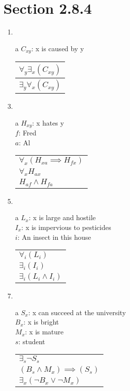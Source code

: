 \documentclass{article}
\begin{document}
	\section{Section 2.8.4}
	\begin{enumerate}
		\item
		\item[a]
			$C_{xy}$: x is caused by y\\
			\begin{tabular}{l}
				$\forall _y \exists _x (C_{xy})$\\ \hline
				$\exists _y \forall _x (C_{xy})$\\
			\end{tabular}
		\item
		\item[a]
			$H_{xy}$: x hates y\\
			$f$: Fred\\
			$a$: Al\\
			\begin{tabular}{l}
				$\forall _x (H_{xa} \implies H_{fx})$\\
				$\forall _x H_{ax}$\\ \hline
				$H_{af} \land H_{fa}$\\
			\end{tabular}
		\item
		\item[a]
			$L_x$: x is large and hostile\\
			$I_x$: x is impervious to pesticides\\
			$i$: An insect in this house\\
			\begin{tabular}{l}
				$\forall _i (L_i)$\\
				$\exists _i (I_i)$\\\hline
				$\exists _i (L_i \land I_i)$\\
			\end{tabular}
		\item
		\item[a]
			$S_x$: x can succeed at the university\\
			$B_x$: x is bright\\
			$M_x$: x is mature\\
			$s$: student\\
			\begin{tabular}{l}
				$\exists _s \lnot S_s$\\
				$(B_s \land M_x) \implies (S_s)$\\ \hline
				$\exists _x (\lnot B_x \lor \lnot M_x)$\\

\end{tabular}
\end{enumerate}
\end{document}
